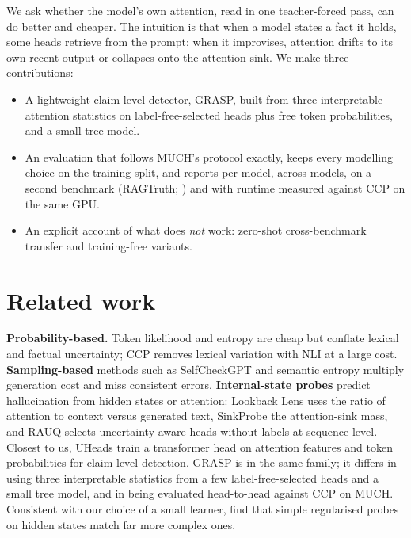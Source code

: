\documentclass[11pt]{article}
\begin{document}
We ask whether the model's own attention, read in one teacher-forced pass, can do better and
cheaper. The intuition is that when a model states a fact it holds, some heads retrieve from the
prompt; when it improvises, attention drifts to its own recent output or collapses onto the
attention sink. We make three contributions:
\begin{itemize}
  \item A lightweight claim-level detector, GRASP, built from three interpretable attention
        statistics on label-free-selected heads plus free token probabilities, and a small tree model.
  \item An evaluation that follows MUCH's protocol exactly, keeps every modelling choice on the
        training split, and reports per model, across models, on a second benchmark (RAGTruth;
        \citealp{niu-etal-2024-ragtruth}) and with runtime measured against CCP on the same GPU.
  \item An explicit account of what does \emph{not} work: zero-shot cross-benchmark transfer and
        training-free variants.
\end{itemize}

\section{Related work}
\textbf{Probability-based.} Token likelihood and entropy are cheap but conflate lexical and factual
uncertainty; CCP \citep{fadeeva-etal-2024-fact} removes lexical variation with NLI at a large
cost. \textbf{Sampling-based} methods such as SelfCheckGPT \citep{manakul-etal-2023-selfcheckgpt}
and semantic entropy \citep{kuhn2023semanticuncertaintylinguisticinvariances} multiply generation
cost and miss consistent errors. \textbf{Internal-state probes} predict hallucination from hidden
states \citep{azaria2023internalstatellmknows,chen2024insidellmsinternalstates} or attention:
Lookback Lens \citep{chuang2024lookbacklensdetectingmitigating} uses the ratio of attention to
context versus generated text, SinkProbe \citep{binkowski2026attentionsinksinternalsignals} the
attention-sink mass, and RAUQ \citep{vazhentsev2026efficienthallucinationdetectionllms} selects
uncertainty-aware heads without labels at sequence level. Closest to us, UHeads
\citep{shelmanov-etal-2025-head} train a transformer head on attention features and token
probabilities for claim-level detection. GRASP is in the same family; it differs in using three
interpretable statistics from a few label-free-selected heads and a small tree model, and in being
evaluated head-to-head against CCP on MUCH. Consistent with our choice of a small learner, \citet{lee2026meanshift} find that simple regularised probes on hidden states match far more complex ones.
\end{document}

